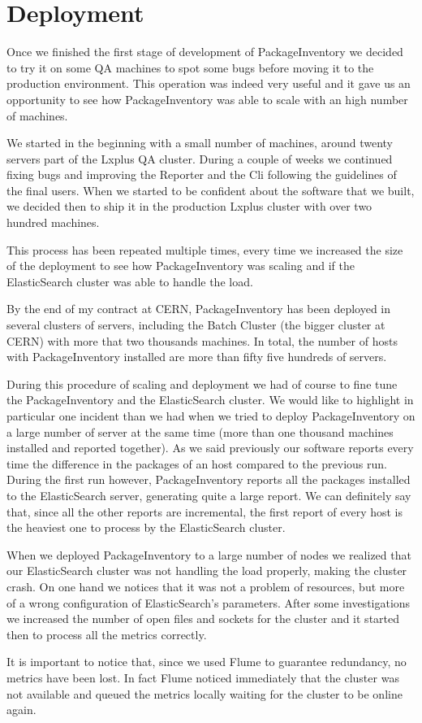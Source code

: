 \section{Deployment}

Once we finished the first stage of development of PackageInventory we
decided to try it on some QA machines to spot some bugs before moving it
to the production environment. This operation was indeed very useful and
it gave us an opportunity to see how PackageInventory was able to scale
with an high number of machines.

We started in the beginning with a small number of machines, around twenty
servers part of the Lxplus QA cluster. During a couple of weeks we
continued fixing bugs and improving the Reporter and the Cli following the
guidelines of the final users. When we started to be confident about the
software that we built, we decided then to ship it in the production
Lxplus cluster with over two hundred machines.

This process has been repeated multiple times, every time we increased the
size of the deployment to see how PackageInventory was scaling and if the
ElasticSearch cluster was able to handle the load.

By the end of my contract at CERN, PackageInventory has been deployed in
several clusters of servers, including the Batch Cluster (the bigger
cluster at CERN) with more that two thousands machines. In total, the
number of hosts with PackageInventory installed are more than fifty five
hundreds of servers.

During this procedure of scaling and deployment we had of course to fine
tune the PackageInventory and the ElasticSearch cluster. We would like to
highlight in particular one incident than we had when we tried to deploy
PackageInventory on a large number of server at the same time (more than
one thousand machines installed and reported together). As we said
previously our software reports every time the difference in the packages
of an host compared to the previous run. During the first run however,
PackageInventory reports all the packages installed to the ElasticSearch
server, generating quite a large report. We can definitely say that, since
all the other reports are incremental, the first report of every host is
the heaviest one to process by the ElasticSearch cluster.

When we deployed PackageInventory to a large number of nodes we realized
that our ElasticSearch cluster was not handling the load properly, making
the cluster crash. On one hand we notices that it was not a problem of
resources, but more of a wrong configuration of ElasticSearch's
parameters. After some investigations we increased the number of open
files and sockets for the cluster and it started then to process all the
metrics correctly.

It is important to notice that, since we used Flume to guarantee
redundancy, no metrics have been lost. In fact Flume noticed immediately
that the cluster was not available and queued the metrics locally waiting
for the cluster to be online again.


